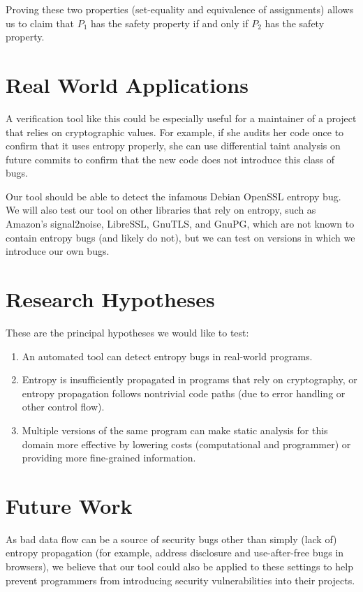 \documentclass[letterpaper,twocolumn,10pt]{article}
\begin{document}
Proving these two properties (set-equality and equivalence of assignments) allows us to claim that $P_1$ has the safety property if and only if $P_2$ has the safety property.

\section{Real World Applications}

A verification tool like this could be especially useful for a maintainer of a project that relies on cryptographic values. For example, if she audits her code once to confirm that it uses entropy properly, she can use differential taint analysis on future commits to confirm that the new code does not introduce this class of bugs. %

Our tool should be able to detect the infamous Debian OpenSSL entropy bug. We will also test our tool on other libraries that rely on entropy, such as Amazon's signal2noise, LibreSSL, GnuTLS, and GnuPG,
which are not known to contain entropy bugs (and likely do not), but we can test on versions in which we introduce our own bugs.

\section{Research Hypotheses}

These are the principal hypotheses we would like to test:

\begin{enumerate}
	\item An automated tool can detect entropy bugs in real-world programs.
	\item Entropy is insufficiently propagated in programs that rely on cryptography, or entropy propagation follows nontrivial code paths (due to error handling or other control flow).
	\item Multiple versions of the same program can make static analysis for this domain more effective by lowering costs (computational and programmer) or providing more fine-grained information.
\end{enumerate}

\section{Future Work}

As bad data flow can be a source of security bugs other than simply (lack of) entropy propagation (for example, 
address disclosure and use-after-free bugs in browsers), we believe that our tool could also be applied to these settings to help prevent
programmers from introducing security vulnerabilities into their projects.
\end{document}
